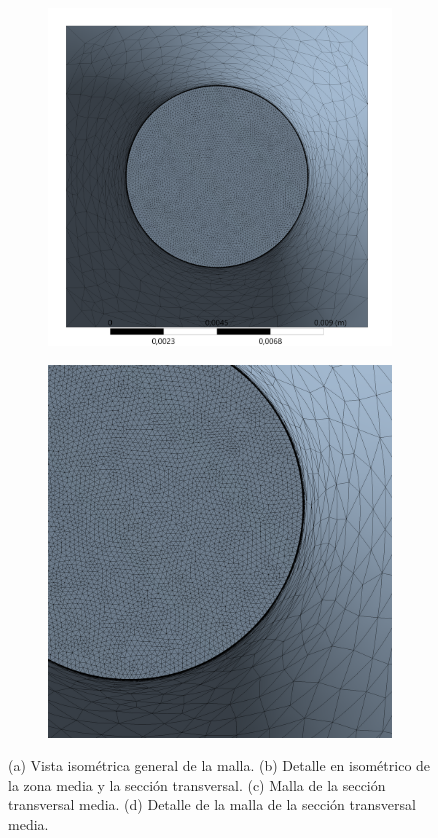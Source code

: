 \begin{figure}[p]
\begin{subfigure}{0.5\linewidth}
		\includegraphics[width=0.9\linewidth]{Imagenes/mcorte.png}
		\caption{}\label{fig:mcorte}
	\end{subfigure}%
		\begin{subfigure}{0.5\linewidth}
		\centering
		\includegraphics[width=0.7\linewidth]{Imagenes/mcorte_det.png}
		\caption{}\label{fig:mcorte_det}
	\end{subfigure}
	\par\bigskip
\caption{(a) Vista isométrica general de la malla. (b) Detalle en isométrico de la zona media y la sección transversal. (c) Malla de la sección transversal media. (d) Detalle de la malla de la sección transversal media.}
\label{fig:malla}
\end{figure}


